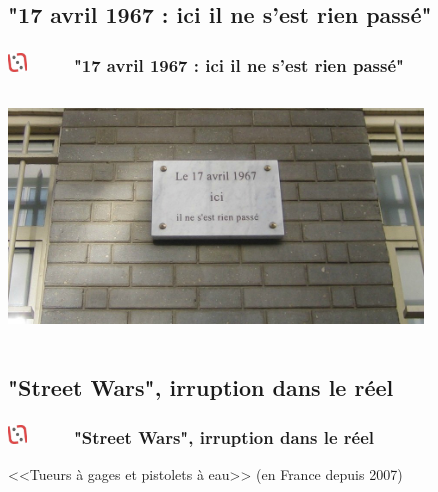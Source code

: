 \documentclass[slidetop,11pt]{beamer}
\def\moreInFrameTitleLeftt{\includegraphics[height=0.5cm]{img/ligueludique-0.png}~~~~~}
\begin{document}

\def\sectionPartIIIa{"17 avril 1967 : ici il ne s'est rien pass{\'e}"}
\subsection{\sectionPartIIIa}
\begin{frame}
	\frametitle{\moreInFrameTitleLeftt \sectionPartIIIa}
	\begin{center}
		\includegraphics[height=6.5cm,width=11.0cm]{img/84869389_o.png} %
	\end{center}
\end{frame}

\def\sectionPartIIIb{"Street Wars", irruption dans le r{\'e}el}
\subsection{\sectionPartIIIb}
\begin{frame}
	\frametitle{\moreInFrameTitleLeftt \sectionPartIIIb}
	\begin{center}
		<<Tueurs {\`a} gages et pistolets {\`a} eau>> (en France depuis 2007)
	\end{center}
\end{frame}

\def\sectionPartIIIc{"Vous avez vu les {\'e}nigmes dans cette pr{\'e}sentation ?"}
\end{document}
